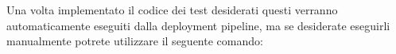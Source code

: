 \begin{center}
	\noindent{}
\end{center}
\noindent
Una volta implementato il codice dei test desiderati questi verranno automaticamente eseguiti dalla deployment pipeline, ma se desiderate eseguirli manualmente potrete utilizzare il seguente comando:
\begin{center}
	\noindent{}
\end{center}

\newpage

